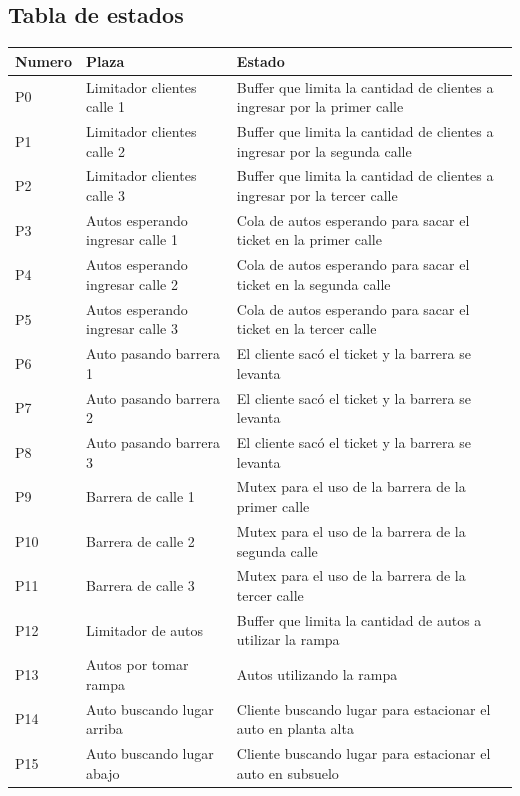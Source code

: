 \documentclass[12pt,a4paper]{article}
\begin{document}
\subsection{Tabla de estados}
\begin{table}[H]
\centering
\begin{tabular}[width=15cm]{ || C{1.5cm} | L{5cm} | L{8.5cm} || }
\hline
	Numero & Plaza & Estado  \\ \hline
	P0 & Limitador clientes calle 1 & Buffer que limita la cantidad de clientes a ingresar por la primer calle  \\ \hline
	P1 & Limitador clientes calle 2 & Buffer que limita la cantidad de clientes a ingresar por la segunda calle \\ \hline
	P2 & Limitador clientes calle 3 & Buffer que limita la cantidad de clientes a ingresar por la tercer calle  \\ \hline
	P3 & Autos esperando ingresar calle 1 & Cola de autos esperando para sacar el ticket en la primer calle  \\ \hline
	P4 & Autos esperando ingresar calle 2 & Cola de autos esperando para sacar el ticket en la segunda calle\\ \hline
	P5 & Autos esperando ingresar calle 3 & Cola de autos esperando para sacar el ticket en la tercer calle \\ \hline
	P6 & Auto pasando barrera 1 & El cliente sacó el ticket y la barrera se levanta  \\ \hline
	P7 & Auto pasando barrera 2 & El cliente sacó el ticket y la barrera se levanta   \\ \hline
	P8 & Auto pasando barrera 3 & El cliente sacó el ticket y la barrera se levanta  \\ \hline
	P9 & Barrera de calle 1 & Mutex para el uso de la barrera de la primer calle   \\ \hline
	P10 & Barrera de calle 2 & Mutex para el uso de la barrera de la segunda calle  \\ \hline
	P11 & Barrera de calle 3 & Mutex para el uso de la barrera de la tercer calle  \\ \hline
	P12 & Limitador de autos & Buffer que limita la cantidad de autos a utilizar la rampa  \\ \hline
	P13 & Autos por tomar rampa & Autos utilizando la rampa \\ \hline
	P14 & Auto buscando lugar arriba & Cliente buscando lugar para estacionar el auto en planta alta \\ \hline
	P15 & Auto buscando lugar abajo & Cliente buscando lugar para estacionar el auto en subsuelo \\ \hline

\end{tabular}
\end{table}
\end{document}
